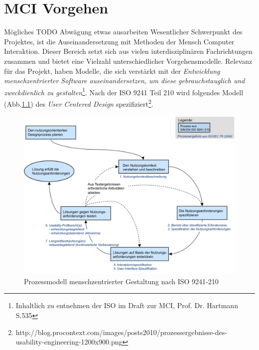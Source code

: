 
\chapter{MCI Vorgehen}

Mögliches TODO Abwägung etwas ausarbeiten
Wesentlicher Schwerpunkt des Projektes, ist die Auseinandersetzung mit Methoden der Mensch Computer Interaktion. Dieser Bereich  setzt sich aus vielen interdisziplinären Fachrichtungen zusammen und bietet eine Vielzahl unterschiedlicher Vorgehensmodelle. 
Relevanz für das Projekt, haben Modelle, die sich verstärkt mit der \textit{Entwicklung menschzentrierter Software auseinandersetzen, um diese gebrauchstauglich und zweckdienlich zu gestalten}\footnote{Inhaltlich zu entnehmen der ISO im Draft zur MCI, Prof. Dr. Hartmann S.535}.
Nach der ISO 9241 Teil 210 wird folgendes Modell (Abb.\ref{prozessmodell}) des \textit{User Centered Design} spezifiziert\footnote{http://blog.procontext.com/images/posts2010/prozessergebnisse-des-usability-engineering-1200x900.png}. 

\begin{figure}[H]
\includegraphics[width=.9\textwidth]{./images/prozessergebnisse.png}
\caption{Prozessmodell menschzentrierter Gestaltung nach ISO 9241-210 }
\label{prozessmodell}
\end{figure}


